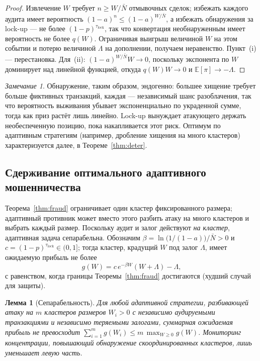\documentclass[11pt]{article}
\theoremstyle{plain}
\newtheorem{lemma}{Лемма}
\theoremstyle{definition}
\theoremstyle{remark}
\newtheorem{remark}{Замечание}
\begin{document}
\begin{proof}
Извлечение $W$ требует $n\ge W/\bar N$ отмывочных сделок; избежать каждого аудита имеет вероятность $(1-a)^n\le(1-a)^{W/\bar N}$, а избежать обнаружения за lock-up --- не более $(1-p)^{\tau_{\mathrm{lock}}}$, так что конвертация необнаруженным имеет вероятность не более $q(W)$. Ограничивая выигрыш величиной $W$ на этом событии и потерю величиной $\Lambda$ на дополнении, получаем неравенство. Пункт~(i) --- перестановка. Для~(ii): $(1-a)^{W/\bar N}W\to0$, поскольку экспонента по $W$ доминирует над линейной функцией, откуда $q(W)W\to0$ и $\mathbb{E}[\pi]\to-\Lambda$.
\end{proof}

\begin{remark}
Обнаружение, таким образом, эндогенно: большее хищение требует больше фиктивных транзакций, каждая --- независимый шанс разоблачения, так что вероятность выживания убывает экспоненциально по украденной сумме, тогда как приз растёт лишь линейно. Lock-up вынуждает атакующего держать необеспеченную позицию, пока накапливается этот риск. Оптимум по адаптивным стратегиям (например, дробление хищения на много кластеров) характеризуется далее, в Теореме~\ref{thm:deter}.
\end{remark}

\subsection{Сдерживание оптимального адаптивного мошенничества}

Теорема~\ref{thm:fraud} ограничивает один кластер фиксированного размера; адаптивный противник может вместо этого разбить атаку на много кластеров и выбрать каждый размер. Поскольку аудит и залог действуют \emph{на кластер}, адаптивная задача сепарабельна. Обозначим $\beta=\ln\!\bigl(1/(1-a)\bigr)/\bar N>0$ и $c=(1-p)^{\tau_{\mathrm{lock}}}\in(0,1]$; тогда кластер, крадущий $W$ под залог $\Lambda$, имеет ожидаемую прибыль не более
\[
g(W)=c\,e^{-\beta W}(W+\Lambda)-\Lambda ,
\]
с равенством, когда границы Теоремы~\ref{thm:fraud} достигаются (худший случай для защиты).

\begin{lemma}[Сепарабельность]\label{lem:sep}
Для любой адаптивной стратегии, разбивающей атаку на $m$ кластеров размеров $W_i>0$ с независимо аудируемыми транзакциями и независимо теряемыми залогами, суммарная ожидаемая прибыль не превосходит $\sum_{i=1}^{m} g(W_i)\le m\,\max_{W\ge0}g(W)$. Мониторинг концентрации, повышающий обнаружение скоординированных кластеров, лишь уменьшает левую часть.
\end{lemma}
\end{document}

